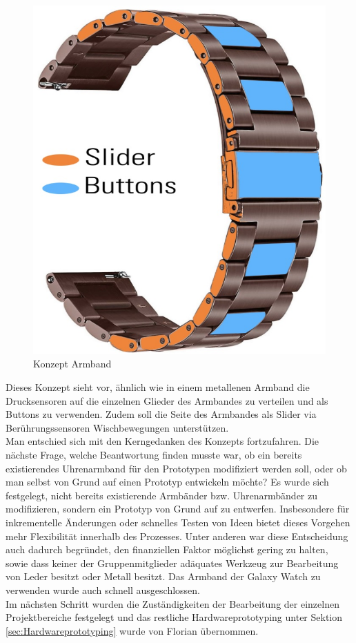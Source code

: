 \documentclass[11pt, a4paper]{article}
\begin{document}
\begin{figure}[h]
	\centering
	\includegraphics[scale=.35]{assets/Strap_initial_idea.jpg}
	\caption{Konzept Armband}
	\label{fig:Initial_Idea}
\end{figure}

Dieses Konzept sieht vor, ähnlich wie in einem metallenen Armband die Drucksensoren auf die einzelnen Glieder des Armbandes zu verteilen und als Buttons zu verwenden. 
Zudem soll die Seite des Armbandes als Slider via Berührungssensoren Wischbewegungen unterstützen. \\
Man entschied sich mit den Kerngedanken des Konzepts fortzufahren. 
Die nächste Frage, welche Beantwortung finden musste war, ob ein bereits existierendes Uhrenarmband für den Prototypen modifiziert werden soll, oder ob man selbst von Grund auf einen Prototyp entwickeln möchte?
Es wurde sich festgelegt, nicht bereits existierende Armbänder bzw. Uhrenarmbänder zu modifizieren, sondern ein Prototyp von Grund auf zu entwerfen. 
Insbesondere für inkrementelle Änderungen oder schnelles Testen von Ideen bietet dieses Vorgehen mehr Flexibilität innerhalb des Prozesses. 
Unter anderen war diese Entscheidung auch dadurch begründet, den finanziellen Faktor möglichst gering zu halten, sowie dass keiner der Gruppenmitglieder adäquates Werkzeug zur Bearbeitung von Leder besitzt oder Metall besitzt. Das Armband der Galaxy Watch zu verwenden wurde auch schnell ausgeschlossen.\\
Im nächsten Schritt wurden die Zuständigkeiten der Bearbeitung der einzelnen Projektbereiche festgelegt und das restliche Hardwareprototyping unter Sektion \ref{sec:Hardwareprototyping} wurde von Florian übernommen.
\end{document}
